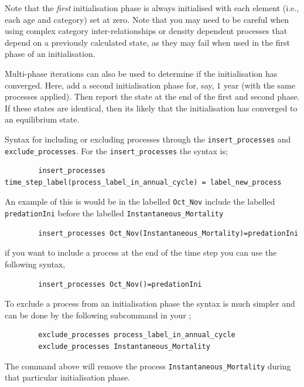 Note that the \emph{first} initialisation phase is always initialised with each element (i.e., each age and category) set at zero. Note that you may need to be careful when using complex category inter-relationships or density dependent processes that depend on a previously calculated state, as they may fail when used in the first phase of an initialisation. 

Multi-phase iterations can also be used to determine if the initialisation has converged. Here, add a second initialisation phase for, say, $1$ year (with the same processes applied). Then report the state at the end of the first and second phase. If these states are identical, then its likely that the initialisation has converged to an equilibrium state.

Syntax for including or excluding processes through the \texttt{insert\_processes} and  \texttt{exclude\_processes}. For the \texttt{insert\_processes} the syntax is;
{\small{\begin{verbatim}
		insert_processes time_step_label(process_label_in_annual_cycle) = label_new_process
\end{verbatim}}}
		An example of this is would be in the  labelled \texttt{Oct\_Nov} include the  labelled \texttt{predationIni} before the  labelled \texttt{Instantaneous\_Mortality}
{\small{\begin{verbatim}
		insert_processes Oct_Nov(Instantaneous_Mortality)=predationIni
\end{verbatim}}}

if you want to include a process at the end of the time step you can use the following syntax,
{\small{\begin{verbatim}
		insert_processes Oct_Nov()=predationIni
		\end{verbatim}}}
To exclude a process from an initialisation phase the syntax is much simpler and can be done by the following subcommand in your ;

{\small{\begin{verbatim}
		exclude_processes process_label_in_annual_cycle
    	exclude_processes Instantaneous_Mortality	
		\end{verbatim}}}

The command above will remove the process \texttt{Instantaneous\_Mortality} during that particular initialisation phase.

\subsubsection*{}

